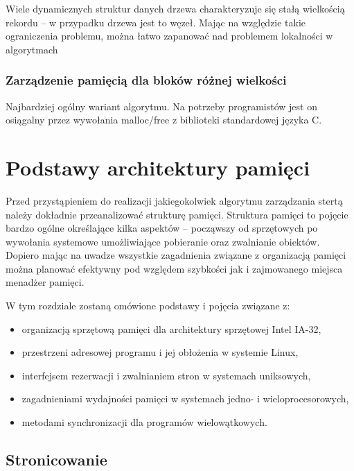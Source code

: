 \documentclass[12pt,a4paper,titlepage,twoside]{mwart}
\begin{document}
Wiele dynamicznych struktur danych drzewa charakteryzuje się stałą wielkością
rekordu -- w przypadku drzewa jest to węzeł. Mając na względzie takie
ograniczenia problemu, można łatwo zapanować nad problemem lokalności w algorytmach

\subsubsection{Zarządzenie pamięcią dla bloków różnej wielkości}

Najbardziej ogólny wariant algorytmu. Na potrzeby programistów jest on
osiągalny przez wywołania malloc/free z biblioteki standardowej języka C.

\newpage


\section{Podstawy architektury pamięci}
\hypertarget{Architektura}{}

Przed przystąpieniem do realizacji jakiegokolwiek algorytmu zarządzania stertą
należy dokładnie przeanalizować strukturę pamięci. Struktura pamięci to pojęcie
bardzo ogólne określające kilka aspektów -- począwszy od sprzętowych po
wywołania systemowe umożliwiające pobieranie oraz zwalnianie obiektów. Dopiero
mając na uwadze wszystkie zagadnienia związane z organizacją pamięci można
planować efektywny pod względem szybkości jak i zajmowanego miejsca menadżer
pamięci.

W tym rozdziale zostaną omówione podstawy i pojęcia związane z:
\begin{itemize}
\item organizacją sprzętową pamięci dla architektury sprzętowej Intel IA-32,
\item przestrzeni adresowej programu i jej obłożenia w systemie Linux,
\item interfejsem rezerwacji i zwalnianiem stron w systemach uniksowych,
\item zagadnieniami wydajności pamięci w systemach jedno- i wieloprocesorowych,
\item metodami synchronizacji dla programów wielowątkowych.
\end{itemize}

\subsection{Stronicowanie}
\end{document}
